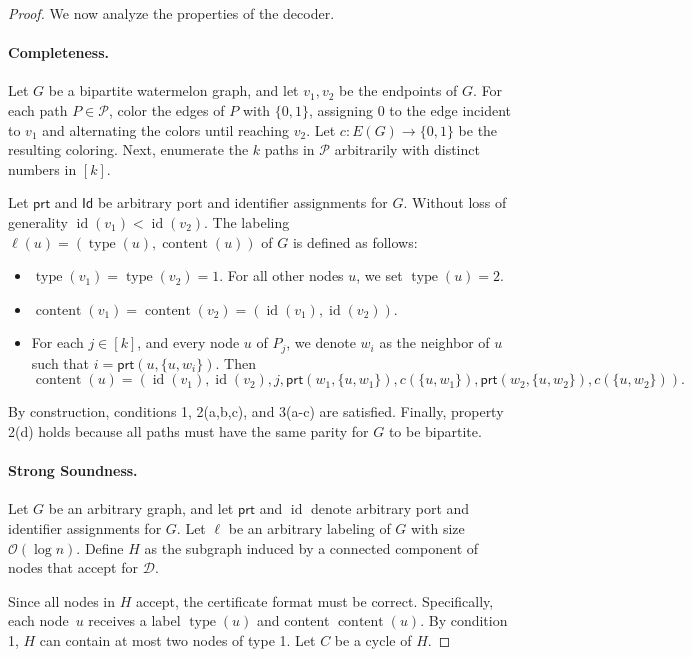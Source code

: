 \documentclass[11pt]{article}
\DeclareMathOperator{\content}{content}
\DeclareMathOperator{\id}{id}
\DeclareMathOperator{\type}{type}
\newcommand*{\cO}{\mathcal{O}}
\newcommand*{\ids}{\mathsf{Id}}
\newcommand*{\ports}{\mathsf{prt}}
\begin{document}
\begin{proof}
We now analyze the properties of the decoder.

\paragraph{Completeness.} Let \( G \) be a bipartite watermelon graph, and let \( v_1, v_2 \) be the endpoints of \( G \). For each path \( P \in \mathcal{P} \), color the edges of \( P \) with \( \{0,1\} \), assigning \( 0 \) to the edge incident to \( v_1 \) and alternating the colors until reaching \( v_2 \). Let \( c: E(G) \rightarrow \{0,1\} \) be the resulting coloring. Next, enumerate the \( k \) paths in \( \mathcal{P} \) arbitrarily with distinct numbers in \( [k] \).

Let \( \ports \) and \( \ids \) be arbitrary port and identifier assignments for \( G \). Without loss of generality \( \id(v_1) < \id(v_2) \). The labeling \( \ell(u) = (\type(u), \content(u)) \) of \( G \) is defined as follows:
\begin{itemize}
    \item \( \type(v_1) = \type(v_2) = 1 \). For all other nodes \( u \), we set \( \type(u) = 2 \).
    \item \( \content(v_1) = \content(v_2) = (\id(v_1), \id(v_2)) \).
    \item For each \( j \in [k] \), and every node \( u \) of \( P_j \), we denote \( w_i \) as the neighbor of \( u \) such that \( i = \ports(u, \{u, w_i\}) \). Then    
    \[
    \content(u) = (\id(v_1), \id(v_2), j, \ports(w_1, \{u, w_1\}), c(\{u, w_1\}), \ports(w_2, \{u, w_2\}), c(\{u, w_2\})).
    \]
\end{itemize}

By construction, conditions 1, 2(a,b,c), and 3(a-c) are satisfied. Finally, property 2(d) holds because all paths must have the same parity for \( G \) to be bipartite.


\paragraph{Strong Soundness.}
Let \( G \) be an arbitrary graph, and let \( \ports \) and \( \id \) denote arbitrary port and identifier assignments for \( G \). Let \( \ell \) be an arbitrary labeling of \( G \) with size \( \cO(\log n) \). Define \( H \) as the subgraph induced by a connected component of nodes that accept for \( \mathcal{D} \).

Since all nodes in \( H \) accept, the certificate format must be correct. Specifically, each node~\( u \) receives a label \( \type(u) \) and content \( \content(u) \). By condition 1, \( H \) can contain at most two nodes of type 1. Let \( C \) be a cycle of \( H \). 


\end{proof}
\end{document}
